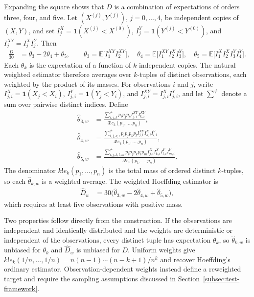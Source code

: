 Expanding the square shows that $D$ is a combination of expectations of orders
three, four, and five. Let $(X^{(j)},Y^{(j)})$, $j=0,\ldots,4$, be independent
copies of $(X,Y)$, and set $I_j^X = \mathbf{1}(X^{(j)}<X^{(0)})$,
$I_j^Y = \mathbf{1}(Y^{(j)}<Y^{(0)})$, and $I_j^{XY}=I_j^XI_j^Y$. Then
\begin{align*}
    \frac{D}{30}
    &= \theta_3-2\theta_4+\theta_5,
    \qquad
    \theta_3
    = \mathbb{E}\bigl[I_1^{XY}I_2^{XY}\bigr],
    \quad
    \theta_4
    = \mathbb{E}\bigl[I_1^{XY}I_2^X I_3^Y\bigr],
    \quad
    \theta_5
    = \mathbb{E}\bigl[I_1^X I_2^X I_3^Y I_4^Y\bigr].
\end{align*}
Each $\theta_k$ is the expectation of a function of $k$ independent copies.
The natural weighted estimator therefore averages over $k$-tuples of distinct
observations, each weighted by the product of its masses. For observations $i$
and $j$, write $I_{j,i}^X = \mathbf{1}(X_j<X_i)$,
$I_{j,i}^Y = \mathbf{1}(Y_j<Y_i)$, and $I_{j,i}^{XY} = I_{j,i}^XI_{j,i}^Y$,
and let $\sum^{\neq}$ denote a sum over pairwise distinct indices. Define
\begin{align*}
    \widehat\theta_{3,w}
    &= \frac{
         \displaystyle
         \sum_{i,j,k}^{\neq}p_ip_jp_k I_{j,i}^{XY}I_{k,i}^{XY}
       }{3!e_3(p_1,\ldots,p_n)},\\
    \widehat\theta_{4,w}
    &= \frac{
         \displaystyle
         \sum_{i,j,k,l}^{\neq}
         p_ip_jp_kp_l I_{j,i}^{XY}I_{k,i}^X I_{l,i}^Y
       }{4!e_4(p_1,\ldots,p_n)},\\
    \widehat\theta_{5,w}
    &= \frac{
         \displaystyle
         \sum_{i,j,k,l,m}^{\neq}
         p_ip_jp_kp_lp_m I_{j,i}^X I_{k,i}^X I_{l,i}^Y I_{m,i}^Y
       }{5!e_5(p_1,\ldots,p_n)}.
\end{align*}
The denominator $k!e_k(p_1,\ldots,p_n)$ is the total mass of ordered distinct
$k$-tuples, so each $\widehat\theta_{k,w}$ is a weighted average. The weighted
Hoeffding estimator is
\begin{align*}
    \widehat D_w
    &= 30\bigl(
         \widehat\theta_{3,w}
         -2\widehat\theta_{4,w}
         +\widehat\theta_{5,w}
       \bigr),
\end{align*}
which requires at least five observations with positive mass.

Two properties follow directly from the construction. If the observations are
independent and identically distributed and the weights are deterministic or
independent of the observations, every distinct tuple has expectation
$\theta_k$, so $\widehat\theta_{k,w}$ is unbiased for $\theta_k$ and
$\widehat D_w$ is unbiased for $D$. Uniform weights give
$k!e_k(1/n,\ldots,1/n) = n(n-1)\cdots(n-k+1)/n^k$ and recover Hoeffding's
ordinary estimator. Observation-dependent weights instead define a reweighted
target and require the sampling assumptions discussed in
Section~\ref{subsec:test-framework}.

